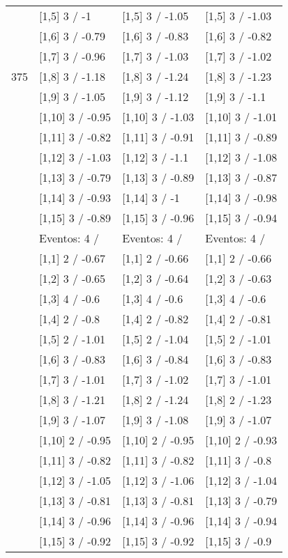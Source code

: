 \begin{table}
\begin{tabular}[t]{llll}
 & {}[1,5] 3  / -1 & {}[1,5] 3  / -1.05 & {}[1,5] 3  / -1.03\\
 & {}[1,6] 3  / -0.79 & {}[1,6] 3  / -0.83 & {}[1,6] 3  / -0.82\\
 & {}[1,7] 3  / -0.96 & {}[1,7] 3  / -1.03 & {}[1,7] 3  / -1.02\\
375 & {}[1,8] 3  / -1.18 & {}[1,8] 3  / -1.24 & {}[1,8] 3  / -1.23\\
\addlinespace
 & {}[1,9] 3  / -1.05 & {}[1,9] 3  / -1.12 & {}[1,9] 3  / -1.1\\
 & {}[1,10] 3  / -0.95 & {}[1,10] 3  / -1.03 & {}[1,10] 3  / -1.01\\
 & {}[1,11] 3  / -0.82 & {}[1,11] 3  / -0.91 & {}[1,11] 3  / -0.89\\
 & {}[1,12] 3  / -1.03 & {}[1,12] 3  / -1.1 & {}[1,12] 3  / -1.08\\
 & {}[1,13] 3  / -0.79 & {}[1,13] 3  / -0.89 & {}[1,13] 3  / -0.87\\
\addlinespace
 & {}[1,14] 3  / -0.93 & {}[1,14] 3  / -1 & {}[1,14] 3  / -0.98\\
 & {}[1,15] 3  / -0.89 & {}[1,15] 3  / -0.96 & {}[1,15] 3  / -0.94\\
 & Eventos:  4 / & Eventos:  4 / & Eventos:  4 /\\
 & {}[1,1] 2  / -0.67 & {}[1,1] 2  / -0.66 & {}[1,1] 2  / -0.66\\
 & {}[1,2] 3  / -0.65 & {}[1,2] 3  / -0.64 & {}[1,2] 3  / -0.63\\
\addlinespace
 & {}[1,3] 4  / -0.6 & {}[1,3] 4  / -0.6 & {}[1,3] 4  / -0.6\\
 & {}[1,4] 2  / -0.8 & {}[1,4] 2  / -0.82 & {}[1,4] 2  / -0.81\\
 & {}[1,5] 2  / -1.01 & {}[1,5] 2  / -1.04 & {}[1,5] 2  / -1.01\\
 & {}[1,6] 3  / -0.83 & {}[1,6] 3  / -0.84 & {}[1,6] 3  / -0.83\\
 & {}[1,7] 3  / -1.01 & {}[1,7] 3  / -1.02 & {}[1,7] 3  / -1.01\\
\addlinespace
500 & {}[1,8] 3  / -1.21 & {}[1,8] 2  / -1.24 & {}[1,8] 2  / -1.23\\
 & {}[1,9] 3  / -1.07 & {}[1,9] 3  / -1.08 & {}[1,9] 3  / -1.07\\
 & {}[1,10] 2  / -0.95 & {}[1,10] 2  / -0.95 & {}[1,10] 2  / -0.93\\
 & {}[1,11] 3  / -0.82 & {}[1,11] 3  / -0.82 & {}[1,11] 3  / -0.8\\
 & {}[1,12] 3  / -1.05 & {}[1,12] 3  / -1.06 & {}[1,12] 3  / -1.04\\
\addlinespace
 & {}[1,13] 3  / -0.81 & {}[1,13] 3  / -0.81 & {}[1,13] 3  / -0.79\\
 & {}[1,14] 3  / -0.96 & {}[1,14] 3  / -0.96 & {}[1,14] 3  / -0.94\\
 & {}[1,15] 3  / -0.92 & {}[1,15] 3  / -0.92 & {}[1,15] 3  / -0.9\\
\bottomrule
\end{tabular}
\end{table}
